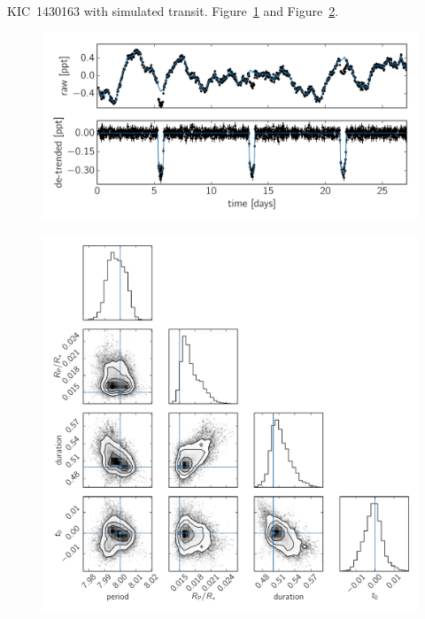 \documentclass[manuscript, letterpaper]{aastex6}
\newcommand{\figureref}[1]{\ref{fig:#1}}
\newcommand{\Figure}[1]{Figure~\figureref{#1}}
\newcommand{\figurelabel}[1]{\label{fig:#1}}
\begin{document}
KIC~1430163 with simulated transit.
\Figure{transit-ml} and \Figure{transit-corner}.

\begin{figure}[!htbp]
\begin{center}
\includegraphics[width=\textwidth]{figures/transit-ml.pdf}
\caption{\figurelabel{transit-ml}}
\end{center}
\end{figure}

\begin{figure}[!htbp]
\begin{center}
\includegraphics[width=\textwidth]{figures/transit-corner.pdf}
\caption{\figurelabel{transit-corner}}
\end{center}
\end{figure}
\end{document}
